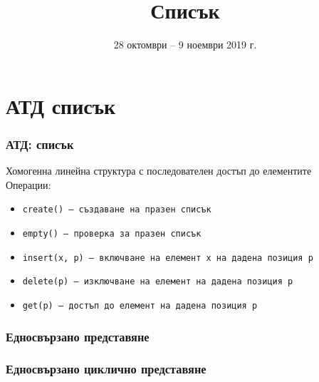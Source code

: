 \documentclass[alsotrans]{beamerswitch}
\title{Списък}
\date[28.10--9.11.2019 г.]{28 октомври -- 9 ноември 2019 г.}
\newcommand{\linkedchain}{
  \doublecell{a1}{a_1}
  \nextdoublecell{a2}{a_2}{a1}
  \nextdots{a2}
  \dotsnextdoublecell{an-1}{a_{n-1}}
  \nextdoublecell{an}{a_n}{an-1}
}
\begin{document}
\begin{frame}
  \titlepage
\end{frame}

\section{АТД списък}

\begin{frame}
  \frametitle{АТД: списък}

  Хомогенна линейна структура с последователен достъп до елементите\\[2ex]
  Операции:\\[1ex]
  \begin{itemize}
  \item \tt{create()} --- създаване на празен списък
  \item \tt{empty()} --- проверка за празен списък
  \item \tt{insert(x, p)} --- включване на елемент \tt x на дадена позиция \tt p
  \item \tt{delete(p)} --- изключване на елемент на дадена позиция \tt p
  \item \tt{get(p)} --- достъп до елемент на дадена позиция \tt p
  \end{itemize}
\end{frame}

\begin{frame}
  \frametitle{Едносвързано представяне}

  \begin{center}
  \end{center}
\end{frame}

\begin{frame}
  \frametitle{Едносвързано циклично представяне}

  \begin{center}
    \small
  \end{center}
\end{frame}
\end{document}

